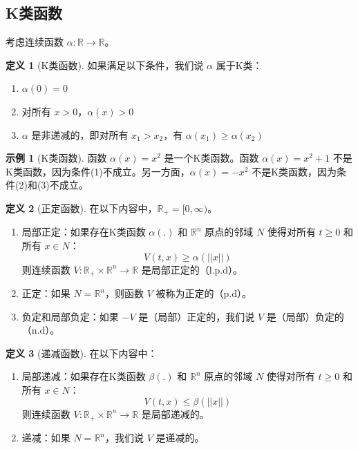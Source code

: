 \documentclass[UTF8,12pt,a4paper]{ctexart}
\theoremstyle{definition}
\newtheorem{definition}{定义}[section]
\newtheorem{example}{示例}[section]
\begin{document}
\subsection{K类函数}

考虑连续函数 $\alpha: \mathbb{R} \rightarrow \mathbb{R}$。

\begin{definition}[K类函数]
如果满足以下条件，我们说 $\alpha$ 属于K类：
\begin{enumerate}
\item $\alpha(0) = 0$
\item 对所有 $x > 0$，$\alpha(x) > 0$
\item $\alpha$ 是非递减的，即对所有 $x_1 > x_2$，有 $\alpha(x_1) \geq \alpha(x_2)$
\end{enumerate}
\end{definition}

\begin{example}[K类函数]
函数 $\alpha(x)=x^2$ 是一个K类函数。函数 $\alpha(x)=x^2+1$ 不是K类函数，因为条件(1)不成立。另一方面，$\alpha(x)=-x^2$ 不是K类函数，因为条件(2)和(3)不成立。
\end{example}

\begin{definition}[正定函数]
在以下内容中，$\mathbb{R}_+ = [0, \infty)$。
\begin{enumerate}
\item 局部正定：如果存在K类函数 $\alpha(.)$ 和 $\mathbb{R}^n$ 原点的邻域 $N$ 使得对所有 $t \geq 0$ 和所有 $x \in N$：
\[
V(t, x) \geq \alpha(||x||)
\]
则连续函数 $V: \mathbb{R}_+ \times \mathbb{R}^n \rightarrow \mathbb{R}$ 是局部正定的（l.p.d）。

\item 正定：如果 $N=\mathbb{R}^n$，则函数 $V$ 被称为正定的（p.d）。

\item 负定和局部负定：如果 $-V$ 是（局部）正定的，我们说 $V$ 是（局部）负定的（n.d）。
\end{enumerate}
\end{definition}

\begin{definition}[递减函数]
在以下内容中：
\begin{enumerate}
\item 局部递减：如果存在K类函数 $\beta(.)$ 和 $\mathbb{R}^n$ 原点的邻域 $N$ 使得对所有 $t \geq 0$ 和所有 $x \in N$：
\[
V(t, x) \leq \beta(||x||)
\]
则连续函数 $V: \mathbb{R}_+ \times \mathbb{R}^n \rightarrow \mathbb{R}$ 是局部递减的。

\item 递减：如果 $N=\mathbb{R}^n$，我们说 $V$ 是递减的。
\end{enumerate}
\end{definition}
\end{document}

